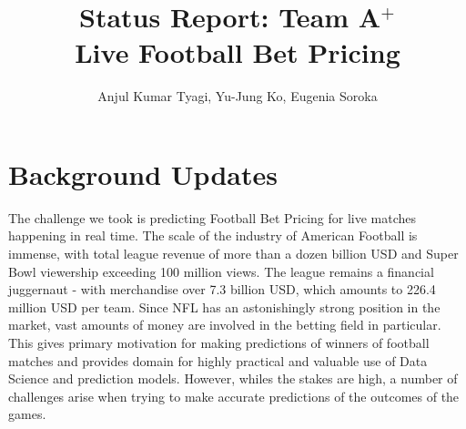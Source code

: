 \documentclass[runningheads]{llncs}
\begin{document}
\mainmatter  %

\title{Status Report: Team A$^+$\\
Live Football Bet Pricing}


\author{Anjul Kumar Tyagi, Yu-Jung Ko, Eugenia Soroka}

%


%
%

\maketitle



\section{Background Updates} 

The challenge we took is predicting Football Bet Pricing for live matches happening in real time. The scale of the industry of American Football is immense, with total league revenue of more than a dozen billion USD and Super Bowl viewership exceeding 100 million views. The league remains a financial juggernaut - with merchandise over 7.3 billion USD, which amounts to 226.4 million USD per team. 
Since NFL has an astonishingly strong position in the market, vast amounts of money are involved in the betting field in particular. This gives primary motivation for making predictions of winners of football matches and provides domain for highly practical and valuable use of Data Science and prediction models. However, whiles the stakes are high, a number of challenges arise when trying to make accurate predictions of the outcomes of the games.
\end{document}
